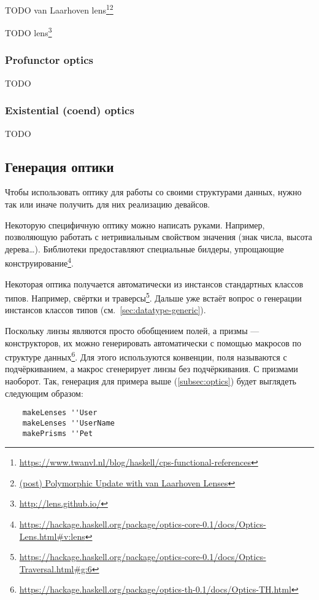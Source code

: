 TODO van Laarhoven lens\footnote{\url{https://www.twanvl.nl/blog/haskell/cps-functional-references}}\footnote{\href{http://r6.ca/blog/20120623T104901Z.html}{(post) Polymorphic Update with van Laarhoven Lenses}} %

TODO lens\footnote{\url{http://lens.github.io/}} %


\subsubsection{Profunctor optics}

TODO %


\subsubsection{Existential (coend) optics}

TODO %


\subsection{Генерация оптики}

Чтобы использовать оптику для работы со своими структурами данных, нужно так или иначе получить для них реализацию девайсов.

Некоторую специфичную оптику можно написать руками.
Например, позволяющую работать с нетривиальным свойством значения (знак числа, высота дерева\ldots).
Библиотеки предоставляют специальные билдеры, упрощающие конструирование\footnote{\url{https://hackage.haskell.org/package/optics-core-0.1/docs/Optics-Lens.html\#v:lens}}.

Некоторая оптика получается автоматически из инстансов стандартных классов типов.
Например, свёртки и траверсы\footnote{\url{https://hackage.haskell.org/package/optics-core-0.1/docs/Optics-Traversal.html\#g:6}}.
Дальше уже встаёт вопрос о генерации инстансов классов типов (см.~\ref{sec:datatype-generic}).

Поскольку линзы являются просто обобщением полей, а призмы --- конструкторов, их можно генерировать автоматически с помощью макросов по структуре данных\footnote{\url{https://hackage.haskell.org/package/optics-th-0.1/docs/Optics-TH.html}}.
Для этого используются конвенции, поля называются с подчёркиванием, а макрос сгенерирует линзы без подчёркивания.
С призмами наоборот.
Так, генерация для примера выше (\ref{subsec:optics}) будет выглядеть следующим образом:
\begin{verbatim}
    makeLenses ''User
    makeLenses ''UserName
    makePrisms ''Pet
\end{verbatim}





